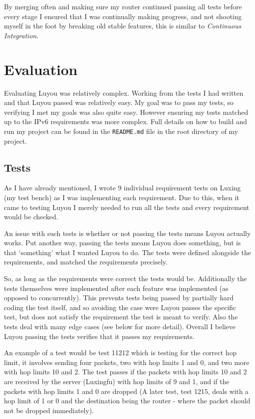 \documentclass[12pt,a4paper,twoside,openany]{report}
\begin{document}
By merging often and making sure my router continued passing all tests before every stage I ensured that I was continually making progress, and not shooting myself in the foot by breaking old stable features, this is similar to \textit{Continuous Integration}.

\chapter{Evaluation}

Evaluating Luyou was relatively complex. Working from the tests I had written and that Luyou passed was relatively easy.  My goal was to pass my tests, so verifying I met my goals was also quite easy.  However ensuring my tests matched up to the IPv6 requirements was more complex. Full details on how to build and run my project can be found in the \verb!README.md! file in the root directory of my project. 

\section{Tests}

As I have already mentioned, I wrote 9 individual requirement tests on Luxing (my test bench) as I was implementing each requirement.  Due to this, when it came to testing Luyou I merely needed to run all the tests and every requirement would be checked.

\bigskip

An issue with such tests is whether or not passing the tests means Luyou actually works. Put another way, passing the tests means Luyou does something, but is that `something' what I wanted Luyou to do.  The tests were defined alongside the requirements, and matched the requirements precisely.  

So, as long as the requirements were correct the tests would be.  Additionally the tests themselves were implemented after each feature was implemented (as opposed to concurrently).  This prevents tests being passed by partially hard coding the test itself, and so avoiding the case were Luyou passes the specific test, but does not satisfy the requirement the test is meant to verify. Also the tests deal with many edge cases (see below for more detail). Overall I believe Luyou passing the tests verifies that it passes my requirements.

\bigskip

An example of a test would be test 11212 which is testing for the correct hop limit, it involves sending four packets, two with hop limits 1 and 0, and two more with hop limits 10 and 2.  The test passes if the packets with hop limits 10 and 2 are received by the server (Luxingfu) with hop limits of 9 and 1, and if the packets with hop limits 1 and 0 are dropped (A later test, test 1215, deals with a hop limit of 1 or 0 and the destination being the router - where the packet should not be dropped immediately).  
\end{document}
